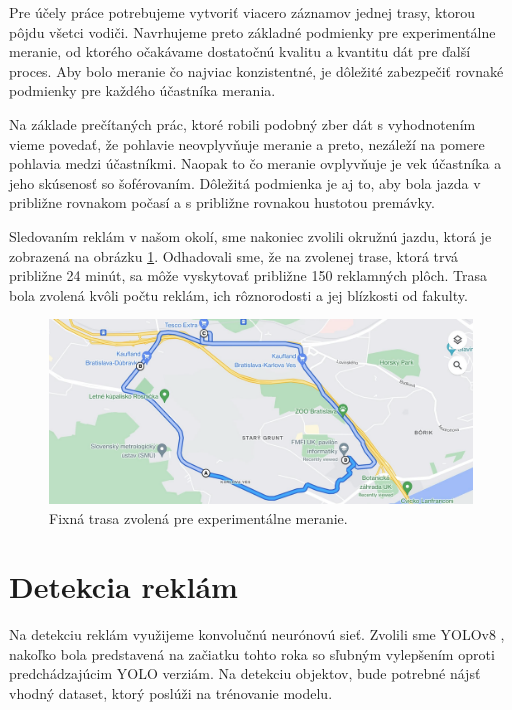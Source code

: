 Pre účely práce potrebujeme vytvoriť viacero záznamov jednej trasy, ktorou pôjdu všetci vodiči. Navrhujeme preto základné podmienky pre experimentálne meranie, od ktorého očakávame dostatočnú kvalitu a kvantitu dát pre ďalší proces. Aby bolo meranie čo najviac konzistentné, je dôležité zabezpečiť rovnaké podmienky pre každého účastníka merania. 

Na základe prečítaných prác, ktoré robili podobný zber dát s vyhodnotením vieme povedať, že pohlavie neovplyvňuje meranie a preto, nezáleží na pomere pohlavia medzi účastníkmi. Naopak to čo meranie ovplyvňuje je vek účastníka a jeho skúsenosť so šoférovaním. Dôležitá podmienka je aj to, aby bola jazda v približne rovnakom počasí a s približne rovnakou hustotou premávky. 

Sledovaním reklám v našom okolí, sme nakoniec zvolili okružnú jazdu, ktorá je zobrazená na obrázku \ref{img:road}. Odhadovali sme, že na zvolenej trase, ktorá trvá približne 24 minút, sa môže vyskytovať približne 150 reklamných plôch. Trasa bola zvolená kvôli počtu reklám, ich rôznorodosti a jej blízkosti od fakulty.
\\
\begin{figure}[ht]
    \centering
    \includegraphics[width=1\textwidth]{images/02/map.png}
    \caption{Fixná trasa zvolená pre experimentálne meranie.}
    \label{img:road}
\end{figure}

\section{Detekcia reklám}

Na detekciu reklám využijeme konvolučnú neurónovú sieť. Zvolili sme YOLOv8 \cite{yolov8}, nakoľko bola predstavená na začiatku tohto roka so sľubným vylepšením oproti predchádzajúcim YOLO verziám. Na detekciu objektov, bude potrebné nájsť vhodný dataset, ktorý poslúži na trénovanie modelu.

